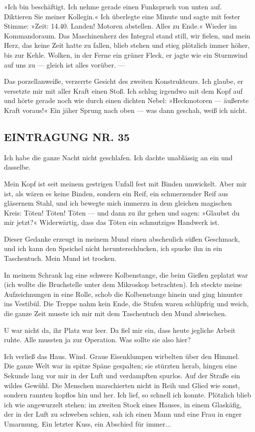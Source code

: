 »Ich bin beschäftigt. Ich nehme gerade einen Funkspruch von unten
auf. Diktieren Sie meiner Kollegin.« Ich überlegte eine Minute und
sagte mit fester Stimme: »Zeit: 14.40. Landen! Motoren abstellen.
Alles zu Ende.« Wieder im Kommandoraum. Das Maschinenherz des
Integral stand still, wir fielen, und mein Herz, das keine Zeit
hatte zu fallen, blieb stehen und stieg plötzlich immer höher, bis
zur Kehle. Wolken, in der Ferne ein grüner Fleck, er jagte wie ein
Sturmwind auf uns zu — gleich ist alles vorüber. —

Das porzellanweiße, verzerrte Gesicht des zweiten Konstrukteurs.
Ich glaube, er versetzte mir mit aller Kraft einen Stoß. Ich schlug
irgendwo mit dem Kopf auf und hörte gerade noch wie durch einen
dichten Nebel: »Heckmotoren — äußerste Kraft voraus!« Ein jäher
Sprung nach oben — was dann geschah, weiß ich nicht.

\subsection{EINTRAGUNG NR. 35}

Ich habe die ganze Nacht nicht geschlafen. Ich dachte unablässig an
ein und dasselbe.

Mein Kopf ist seit meinem gestrigen Unfall fest mit Binden
umwickelt. Aber mir ist, als wären es keine Binden, sondern ein
Reif, ein schmerzender Reif aus gläsernem Stahl, und ich bewegte
mich immerzu in dem gleichen magischen Kreis: Töten! Töten! Töten —
und dann zu ihr gehen und sagen: »Glaubst du mir jetzt?«
Widerwärtig, dass das Töten ein schmutziges Handwerk ist.

Dieser Gedanke erzeugt in meinem Mund einen abscheulich süßen
Geschmack, und ich kann den Speichel nicht herunterschlucken, ich
spucke ihn in ein Taschentuch. Mein Mund ist trocken.

In meinem Schrank lag eine schwere Kolbenstange, die beim Gießen
geplatzt war (ich wollte die Bruchstelle unter dem Mikroskop
betrachten). Ich steckte meine Aufzeichnungen in eine Rolle, schob
die Kolbenstange hinein und ging hinunter ins Vestibül. Die Treppe
nahm kein Ende, die Stufen waren schlüpfrig und weich, die ganze
Zeit musste ich mir mit dem Taschentuch den Mund abwischen.

U war nicht da, ihr Platz war leer. Da fiel mir ein, dass heute
jegliche Arbeit ruhte. Alle mussten ja zur Operation. Was sollte
sie also hier?

Ich verließ das Haus. Wind. Graue Eisenklumpen wirbelten über den
Himmel. Die ganze Welt war in spitze Späne gespalten; sie stürzten
herab, hingen eine Sekunde lang vor mir in der Luft und verdampften
spurlos. Auf der Straße ein wildes Gewühl. Die Menschen
marschierten nicht in Reih und Glied wie sonst, sondern rannten
kopflos hin und her. Ich lief, so schnell ich konnte. Plötzlich
blieb ich wie angewurzelt stehen: im zweiten Stock eines Hauses, in
einem Glaskäfig, der in der Luft zu schweben schien, sah ich einen
Mann und eine Frau in enger Umarmung. Ein letzter Kuss, ein
Abschied für immer...

